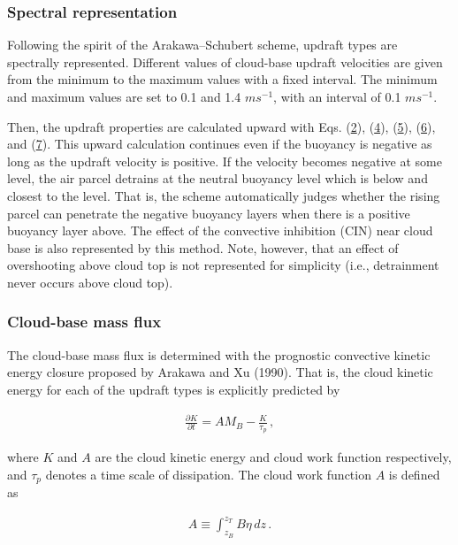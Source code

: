 \hypertarget{spectral-representation}{%
\subsubsection{Spectral representation}\label{spectral-representation}}

Following the spirit of the Arakawa--Schubert scheme, updraft types are
spectrally represented. Different values of cloud-base updraft
velocities are given from the minimum to the maximum values with a fixed
interval. The minimum and maximum values are set to 0.1 and 1.4
\(m s^{-1}\), with an interval of 0.1 \(m s^{-1}\).

Then, the updraft properties are calculated upward with Eqs.
(\href{p-cum.2}{2}), (\href{p-cum.4}{4}), (\href{p-cum.5}{5}),
(\href{p-cum.6}{6}), and (\href{p-cum.7}{7}). This upward calculation
continues even if the buoyancy is negative as long as the updraft
velocity is positive. If the velocity becomes negative at some level,
the air parcel detrains at the neutral buoyancy level which is below and
closest to the level. That is, the scheme automatically judges whether
the rising parcel can penetrate the negative buoyancy layers when there
is a positive buoyancy layer above. The effect of the convective
inhibition (CIN) near cloud base is also represented by this method.
Note, however, that an effect of overshooting above cloud top is not
represented for simplicity (i.e., detrainment never occurs above cloud
top).

\hypertarget{cloud-base-mass-flux}{%
\subsubsection{Cloud-base mass flux}\label{cloud-base-mass-flux}}

The cloud-base mass flux is determined with the prognostic convective
kinetic energy closure proposed by Arakawa and Xu (1990). That is, the
cloud kinetic energy for each of the updraft types is explicitly
predicted by

\begin{eqnarray}
 \frac{\partial K}{\partial t} = AM_B - \frac{K}{\tau_p}\,,  \label{p-cum.8}
\end{eqnarray}

where \(K\) and \(A\) are the cloud kinetic energy and cloud work
function respectively, and \(\tau_p\) denotes a time scale of
dissipation. The cloud work function \(A\) is defined as

\begin{eqnarray}
 A \equiv \int_{z_B}^{z_T} B \eta \,dz\,.
\end{eqnarray}

